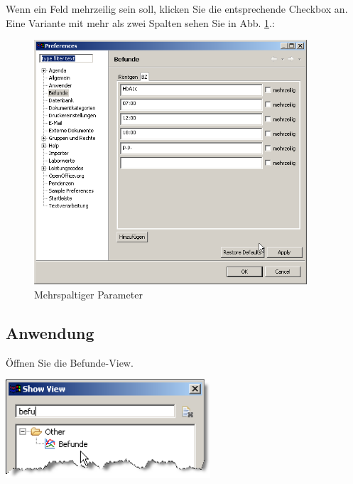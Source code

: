 Wenn ein Feld mehrzeilig sein soll, klicken Sie die entsprechende Checkbox an. Eine Variante mit mehr als zwei Spalten sehen Sie in Abb. \ref{fig:befunde4}.:
\begin{figure}[htp]
    \includegraphics[width=4in]{images/befunde7.png}
    \caption{Mehrspaltiger Parameter}\label{fig:befunde4}
\end{figure}

\pagebreak

\subsection{Anwendung}

Öffnen Sie die  Befunde-View.
\begin{flushleft}
\includegraphics[width=3in]{images/befunde4.png}
\end{flushleft}

